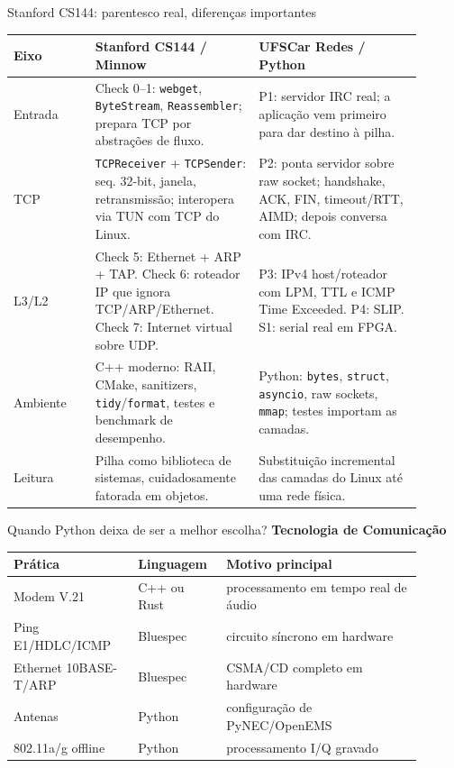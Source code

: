 \documentclass[aspectratio=169,11pt]{beamer}
\newcommand{\eyebrow}[1]{{\color{caipyraOrange}\small\bfseries #1}\par\vspace{0.25em}}
\begin{document}
\begin{frame}{Stanford CS144: parentesco real, diferenças importantes}
  \scriptsize
  \begin{tabular}{@{}p{0.18\linewidth}p{0.36\linewidth}p{0.36\linewidth}@{}}
    \toprule
    Eixo & Stanford CS144 / Minnow & UFSCar Redes / Python\\
    \midrule
    Entrada &
    Check 0--1: \texttt{webget}, \texttt{ByteStream}, \texttt{Reassembler};
    prepara TCP por abstrações de fluxo. &
    P1: servidor IRC real; a aplicação vem primeiro para dar destino à pilha.\\
    \addlinespace[0.35em]
    TCP &
    \texttt{TCPReceiver} + \texttt{TCPSender}: seq. 32-bit, janela,
    retransmissão; interopera via TUN com TCP do Linux. &
    P2: ponta servidor sobre raw socket; handshake, ACK, FIN, timeout/RTT,
    AIMD; depois conversa com IRC.\\
    \addlinespace[0.35em]
    L3/L2 &
    Check 5: Ethernet + ARP + TAP. Check 6: roteador IP que ignora
    TCP/ARP/Ethernet. Check 7: Internet virtual sobre UDP. &
    P3: IPv4 host/roteador com LPM, TTL e ICMP Time Exceeded. P4: SLIP.
    S1: serial real em FPGA.\\
    \addlinespace[0.35em]
    Ambiente &
    C++ moderno: RAII, CMake, sanitizers, \texttt{tidy}/\texttt{format},
    testes e benchmark de desempenho. &
    Python: \texttt{bytes}, \texttt{struct}, \texttt{asyncio}, raw sockets,
    \texttt{mmap}; testes importam as camadas.\\
    \addlinespace[0.35em]
    Leitura &
    Pilha como biblioteca de sistemas, cuidadosamente fatorada em objetos. &
    Substituição incremental das camadas do Linux até uma rede física.\\
    \bottomrule
  \end{tabular}
\end{frame}

\begin{frame}{Quando Python deixa de ser a melhor escolha?}
  \eyebrow{Tecnologia de Comunicação}
  \begin{tabular}{@{}>{\raggedright\arraybackslash}p{0.28\linewidth}>{\raggedright\arraybackslash}p{0.18\linewidth}>{\raggedright\arraybackslash}p{0.44\linewidth}@{}}
    \toprule
    Prática & Linguagem & Motivo principal\\
    \midrule
    Modem V.21 & C++ ou Rust & processamento em tempo real de áudio\\
    Ping E1/HDLC/ICMP & Bluespec & circuito síncrono em hardware\\
    Ethernet 10BASE-T/ARP & Bluespec & CSMA/CD completo em hardware\\
    Antenas & Python & configuração de PyNEC/OpenEMS\\
    802.11a/g offline & Python & processamento I/Q gravado\\
    \bottomrule
  \end{tabular}
\end{frame}
\end{document}
